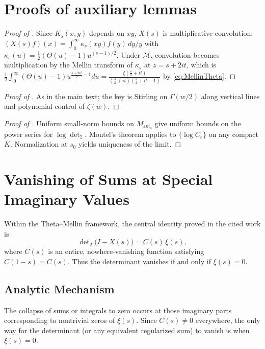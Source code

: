 \documentclass[11pt]{article}
\numberwithin{equation}{section}
\theoremstyle{definition}
\theoremstyle{remark}
\newcommand{\eps}{\varepsilon}
\newcommand{\Dettwo}{\operatorname{det}_2}
\newcommand{\1}{\mathbbm{1}}
\newcommand{\cM}{\mathcal{M}}
\begin{document}
\section{Proofs of auxiliary lemmas}

\begin{proof}[Proof of ]
Since \(K_s(x,y)\) depends on \(xy\), \(X(s)\) is multiplicative convolution:
\((X(s)f)(x)=\int_0^\infty \kappa_s(xy) f(y)\,dy/y\) with \(\kappa_s(u)=\tfrac12(\Theta(u)-1)u^{(s-1)/2}\).
Under \(\cM\), convolution becomes multiplication by the Mellin transform of \(\kappa_s\) at \(z=s+2it\), which is
\(
\frac12\int_0^\infty (\Theta(u)-1)u^{\frac{s+2it}{2}-1}du
=\frac{\xi(\frac{s}{2}+it)}{\left(\frac{s}{2}+it\right)\left(\frac{s}{2}+it-1\right)}
\)
by \eqref{eq:MellinTheta}.
\end{proof}

\begin{proof}[Proof of ]
As in the main text; the key is Stirling on \(\Gamma(w/2)\) along vertical lines and polynomial control of \(\zeta(w)\).
\end{proof}

\begin{proof}[Proof of ]
Uniform small-norm bounds on \(M_{\eps m_s}\) give uniform bounds on the power series for \(\log\Dettwo\). Montel’s theorem applies to \(\{\log C_\eps\}\) on any compact \(K\). Normalization at \(s_0\) yields uniqueness of the limit.
\end{proof}

\section{Vanishing of Sums at Special Imaginary Values}

Within the Theta--Mellin framework, the central identity proved in the cited work is
\begin{equation}
\det\nolimits_{2}\big(I - X(s)\big) = C(s)\, \xi(s),
\end{equation}
where $C(s)$ is an entire, nowhere-vanishing function satisfying $C(1-s) = C(s)$. Thus the determinant vanishes if and only if $\xi(s)=0$.

\subsection{Analytic Mechanism}
The collapse of sums or integrals to zero occurs at those imaginary parts corresponding to nontrivial zeros of $\xi(s)$. Since $C(s)\neq 0$ everywhere, the only way for the determinant (or any equivalent regularized sum) to vanish is when $\xi(s)=0$.
\end{document}
